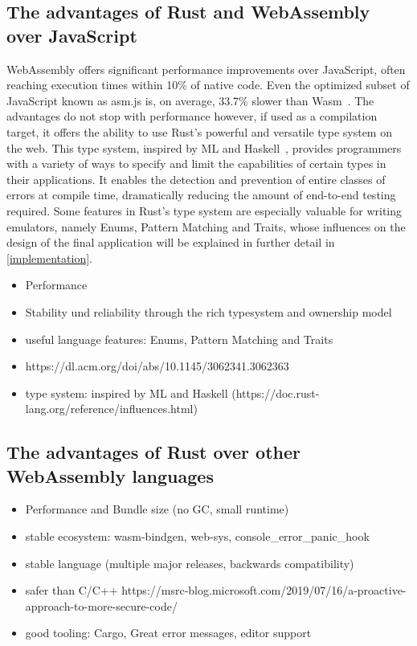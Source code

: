 \subsection{The advantages of Rust and WebAssembly over JavaScript}

WebAssembly offers significant performance improvements over JavaScript, often reaching execution times within 10\% of native code. Even the optimized subset of JavaScript known as asm.js is, on average, 33.7\% slower than Wasm~\cite[Chapter~7.3]{wasmspeed}. The advantages do not stop with performance however, if used as a compilation target, it offers the ability to use Rust's powerful and versatile type system on the web.
This type system, inspired by ML and Haskell~\cite{rustinfluences}, provides programmers with a variety of ways to specify and limit the capabilities of certain types in their applications.
It enables the detection and prevention of entire classes of errors at compile time, dramatically reducing the amount of end-to-end testing required.
Some features in Rust's type system are especially valuable for writing emulators, namely Enums, Pattern Matching and Traits, whose influences on the design of the final application will be explained in further detail in \cref{implementation}.

\begin{itemize}
  \item Performance
  \item Stability und reliability through the rich typesystem and ownership model
  \item useful language features: Enums, Pattern Matching and Traits
  \item https://dl.acm.org/doi/abs/10.1145/3062341.3062363
  \item type system: inspired by ML and Haskell (https://doc.rust-lang.org/reference/influences.html)
\end{itemize}

\subsection{The advantages of Rust over other WebAssembly languages}

\begin{itemize}
  \item Performance and Bundle size (no GC, small runtime)
  \item stable ecosystem: wasm-bindgen, web-sys, console\_error\_panic\_hook
  \item stable language (multiple major releases, backwards compatibility)
  \item safer than C/C++ https://msrc-blog.microsoft.com/2019/07/16/a-proactive-approach-to-more-secure-code/
  \item good tooling: Cargo, Great error messages, editor support
\end{itemize}


